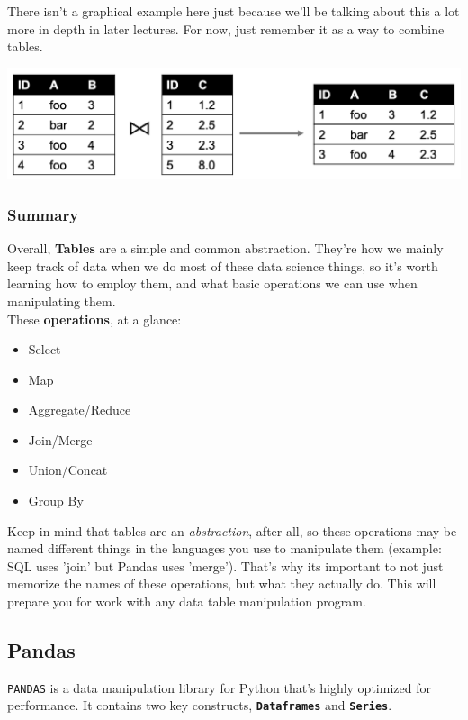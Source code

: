 \documentclass[english, 10pt]{article}
\begin{document}
There isn't a graphical example here just because we'll be talking about this a lot more in depth in later lectures. For now, just remember it as a way to combine tables.
\begin{center}
	\includegraphics[scale=0.4]{img/Merge.png}
\end{center}
\subsubsection{Summary}

Overall, \textbf{Tables} are a simple and common abstraction. They're how we mainly keep track of data when we do most of these data science things, so it's worth learning how to employ them, and what basic operations we can use when manipulating them.\\

These \textbf{operations}, at a glance:

\begin{itemize}
	\item Select
	\item Map
	\item Aggregate/Reduce
	\item Join/Merge
	\item Union/Concat
	\item Group By
\end{itemize} 

Keep in mind that tables are an \textit{abstraction}, after all, so these operations may be named different things in the languages you use to manipulate them (example: SQL uses 'join' but Pandas uses 'merge'). That's why its important to not just memorize the names of these operations, but what they actually do. This will prepare you for work with any data table manipulation program.

\subsection{Pandas}

\texttt{PANDAS} is a data manipulation library for Python that's highly optimized for performance. It contains two key constructs, \textbf{\texttt{Dataframes}} and \textbf{\texttt{Series}}.
\end{document}
